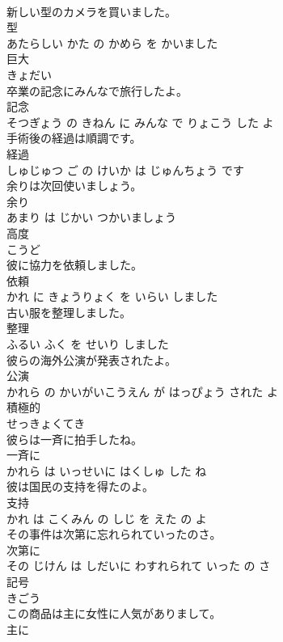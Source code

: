 \documentclass[8pt]{extreport}
\begin{document}
\begin{CJK}{UTF8}{min}
\\	新しい型のカメラを買いました。	
\\	型 
\\	あたらしい かた の かめら を かいました			
\\	巨大	
\\	きょだい			
\\	卒業の記念にみんなで旅行したよ。	
\\	記念 
\\	そつぎょう の きねん に みんな で りょこう した よ			
\\	手術後の経過は順調です。	
\\	経過 
\\	しゅじゅつ ご の けいか は じゅんちょう です			
\\	余りは次回使いましょう。	
\\	余り 
\\	あまり は じかい つかいましょう			
\\	高度	
\\	こうど			
\\	彼に協力を依頼しました。	
\\	依頼 
\\	かれ に きょうりょく を いらい しました			
\\	古い服を整理しました。	
\\	整理 
\\	ふるい ふく を せいり しました			
\\	彼らの海外公演が発表されたよ。	
\\	公演 
\\	かれら の かいがいこうえん が はっぴょう された よ			
\\	積極的	
\\	せっきょくてき			
\\	彼らは一斉に拍手したね。	
\\	一斉に 
\\	かれら は いっせいに はくしゅ した ね			
\\	彼は国民の支持を得たのよ。	
\\	支持 
\\	かれ は こくみん の しじ を えた の よ			
\\	その事件は次第に忘れられていったのさ。	
\\	次第に 
\\	その じけん は しだいに わすれられて いった の さ			
\\	記号	
\\	きごう			
\\	この商品は主に女性に人気がありまして。	
\\	主に 

\end{CJK}
\end{document}
